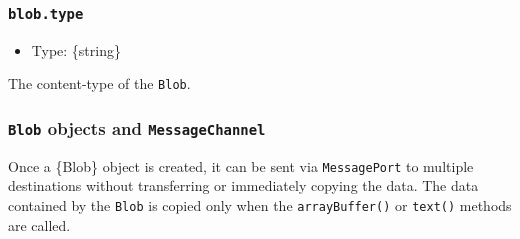 \subsubsection{\texorpdfstring{\texttt{blob.type}}{blob.type}}\label{blob.type}

\begin{itemize}
\tightlist
\item
  Type: \{string\}
\end{itemize}

The content-type of the \texttt{Blob}.

\subsubsection{\texorpdfstring{\texttt{Blob} objects and
\texttt{MessageChannel}}{Blob objects and MessageChannel}}\label{blob-objects-and-messagechannel}

Once a \{Blob\} object is created, it can be sent via
\texttt{MessagePort} to multiple destinations without transferring or
immediately copying the data. The data contained by the \texttt{Blob} is
copied only when the \texttt{arrayBuffer()} or \texttt{text()} methods
are called.

